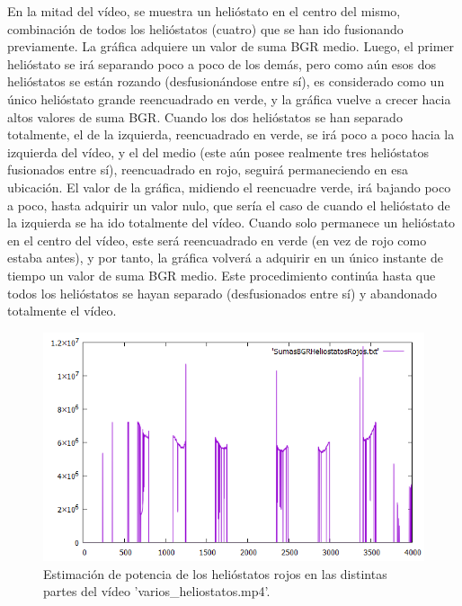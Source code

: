 En la mitad del vídeo, se muestra un helióstato en el centro del mismo, combinación de todos los helióstatos (cuatro) que se han ido fusionando previamente. La gráfica adquiere un valor de suma BGR medio. Luego, el primer helióstato se irá separando poco a poco de los demás, pero como aún esos dos helióstatos se están rozando (desfusionándose entre sí), es considerado como un único helióstato grande reencuadrado en verde, y la gráfica vuelve a crecer hacia altos valores de suma BGR. Cuando los dos helióstatos se han separado totalmente, el de la izquierda, reencuadrado en verde, se irá poco a poco hacia la izquierda del vídeo, y el del medio (este aún posee realmente tres helióstatos fusionados entre sí), reencuadrado en rojo, seguirá permaneciendo en esa ubicación. El valor de la gráfica, midiendo el reencuadre verde, irá bajando poco a poco, hasta adquirir un valor nulo, que sería el caso de cuando el helióstato de la izquierda se ha ido totalmente del vídeo. Cuando solo permanece un helióstato en el centro del vídeo, este será reencuadrado en verde (en vez de rojo como estaba antes), y por tanto, la gráfica volverá a adquirir en un único instante de tiempo un valor de suma BGR medio. Este procedimiento continúa hasta que todos los helióstatos se hayan separado (desfusionados entre sí) y abandonado totalmente el vídeo.

\begin{figure}[h!]
  	\centering
	\includegraphics[width=\textwidth]{ValidacionCualitativaFuncionEstimacionPotencia/SumasBGRHeliostatosRojosVideo1.png}
	\caption{Estimación de potencia de los helióstatos rojos en las distintas partes del vídeo 'varios\_heliostatos.mp4'.
	\label{fig:ValidacionCualitativaFuncionEstimacionPotencia/SumasBGRHeliostatosRojosVideo1.png}}
\end{figure}

